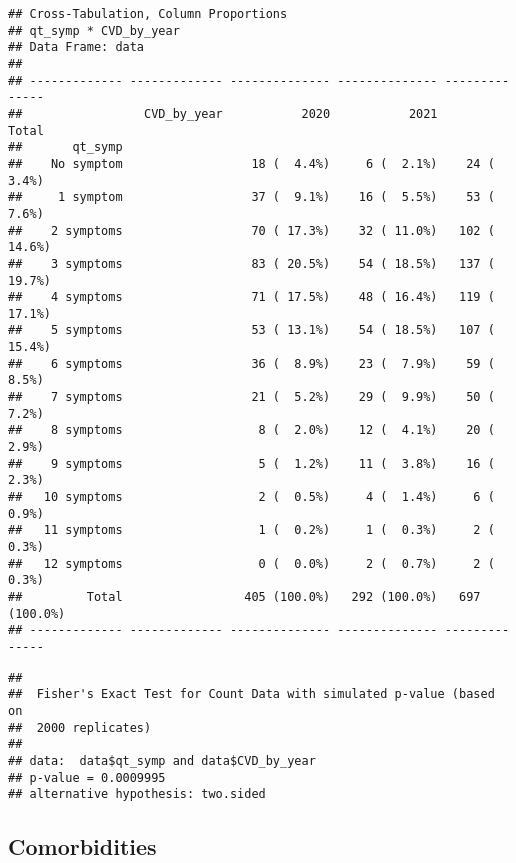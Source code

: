 \documentclass[
]{article}
\newenvironment{Shaded}{\begin{snugshade}}{\end{snugshade}}
\newcommand{\AttributeTok}[1]{\textcolor[rgb]{0.13,0.29,0.53}{#1}}
\newcommand{\ConstantTok}[1]{\textcolor[rgb]{0.56,0.35,0.01}{#1}}
\newcommand{\FunctionTok}[1]{\textcolor[rgb]{0.13,0.29,0.53}{\textbf{#1}}}
\newcommand{\NormalTok}[1]{#1}
\newcommand{\SpecialCharTok}[1]{\textcolor[rgb]{0.81,0.36,0.00}{\textbf{#1}}}
\begin{document}
\begin{verbatim}
## Cross-Tabulation, Column Proportions  
## qt_symp * CVD_by_year  
## Data Frame: data  
## 
## ------------- ------------- -------------- -------------- --------------
##                 CVD_by_year           2020           2021          Total
##       qt_symp                                                           
##    No symptom                  18 (  4.4%)     6 (  2.1%)    24 (  3.4%)
##     1 symptom                  37 (  9.1%)    16 (  5.5%)    53 (  7.6%)
##    2 symptoms                  70 ( 17.3%)    32 ( 11.0%)   102 ( 14.6%)
##    3 symptoms                  83 ( 20.5%)    54 ( 18.5%)   137 ( 19.7%)
##    4 symptoms                  71 ( 17.5%)    48 ( 16.4%)   119 ( 17.1%)
##    5 symptoms                  53 ( 13.1%)    54 ( 18.5%)   107 ( 15.4%)
##    6 symptoms                  36 (  8.9%)    23 (  7.9%)    59 (  8.5%)
##    7 symptoms                  21 (  5.2%)    29 (  9.9%)    50 (  7.2%)
##    8 symptoms                   8 (  2.0%)    12 (  4.1%)    20 (  2.9%)
##    9 symptoms                   5 (  1.2%)    11 (  3.8%)    16 (  2.3%)
##   10 symptoms                   2 (  0.5%)     4 (  1.4%)     6 (  0.9%)
##   11 symptoms                   1 (  0.2%)     1 (  0.3%)     2 (  0.3%)
##   12 symptoms                   0 (  0.0%)     2 (  0.7%)     2 (  0.3%)
##         Total                 405 (100.0%)   292 (100.0%)   697 (100.0%)
## ------------- ------------- -------------- -------------- --------------
\end{verbatim}

\begin{Shaded}
\end{Shaded}

\begin{verbatim}
## 
##  Fisher's Exact Test for Count Data with simulated p-value (based on
##  2000 replicates)
## 
## data:  data$qt_symp and data$CVD_by_year
## p-value = 0.0009995
## alternative hypothesis: two.sided
\end{verbatim}

\hypertarget{comorbidities}{%
\subsection{Comorbidities}\label{comorbidities}}
\end{document}

